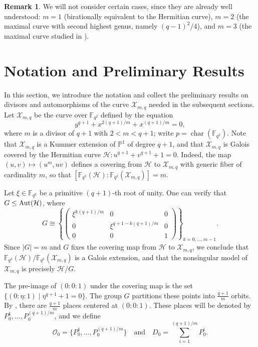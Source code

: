 \documentclass[12pt]{amsart}
\theoremstyle{remark}
\theoremstyle{definition}
\newtheorem{remark}[theorem]{Remark}
\def\Aut{{\rm Aut}}
\begin{document}
\begin{remark}
We will not consider certain cases, since they are already well understood: 
$m=1$ (birationally equivalent to the Hermitian curve), 
$m=2$ (the maximal curve with second highest genus, namely $(q-1)^2/4$), 
and $m=3$ (the maximal curve studied in \cite{BMV}).
\end{remark}

	\section{Notation and Preliminary Results}\label{sec:results}
In this section, we introduce the notation and collect the preliminary 
results on divisors and automorphisms of the curve $\mathcal{X}_{m,q}$ 
needed in the subsequent sections.
 Let $\mathcal{X}_{m,q}$ be the curve over $\mathbb{F}_{q^2}$ defined 
by the equation
\[
y^{q+1} + x^{2(q+1)/m} + x^{(q+1)/m} = 0,
\]
where $m$ is a divisor of $q+1$ with $2 < m < q+1$; write $p=\operatorname{char}(\mathbb{F}_{q^2})$. Note that 
$\mathcal{X}_{m,q}$ is a Kummer extension of $\mathbb{P}^1$ of degree 
$q+1$, and that $\mathcal{X}_{m,q}$ is Galois covered by the Hermitian 
curve $\mathcal{H}:u^{q+1}+v^{q+1}+1=0$. Indeed, the map 
$(u,v) \mapsto (u^m,uv)$ defines a covering from $\mathcal{H}$ to 
$\mathcal{X}_{m,q}$ with generic fiber of cardinality $m$, so that 
$[\mathbb{F}_{q^2}(\mathcal{H}):\mathbb{F}_{q^2}(\mathcal{X}_{m,q})]=m$.

Let $\xi\in\mathbb{F}_{q^2}$ be a primitive $(q+1)$-th root of unity. 
One can verify that $G \leq \Aut(\mathcal{H})$, where
$$G \cong \left\{\begin{pmatrix}
    \xi^{k(q+1)/m} & 0 & 0 \\
    0 & \xi^{q+1 - k(q+1)/m} & 0 \\
    0 & 0 & 1
\end{pmatrix} \right\}_{k = 0, \ldots, m-1}.$$
Since $|G| = m$ and $G$ fixes the covering map from $\mathcal{H}$ to 
$\mathcal{X}_{m,q}$, we conclude that 
$\mathbb{F}_{q^2}(\mathcal{H})/\mathbb{F}_{q^2}(\mathcal{X}_{m,q})$ 
is a Galois extension, and that the nonsingular model of 
$\mathcal{X}_{m,q}$ is precisely $\mathcal{H}/G$.

The pre-image of $(0:0:1)$ under the covering map is the set 
$\{(0:\eta:1) \mid \eta^{q+1}+1=0\}$. The group $G$ partitions these 
points into $\frac{q+1}{m}$ orbits. By \cite[Lemma~VII.6.15]{lorenzini}, 
there are $\frac{q+1}{m}$ places centered at $(0:0:1)$. These places 
will be denoted by $P_0^1, \ldots, P_0^{(q+1)/m}$, and we define
$$\mathcal{O}_0 = \{P_0^1, \ldots, P_0^{(q+1)/m}\} \quad 
\text{and} \quad D_0=\sum_{i=1}^{(q+1)/m}P_0^i.$$
\end{document}
